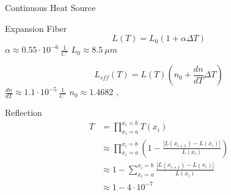 \begin{frame}{Continuous Heat Source}
	\centering
\end{frame}


\begin{frame}{Expansion Fiber}
	\centering
	\begin{equation*}
		L(T) = L_0(1 + \alpha \Delta T)
	\end{equation*}
	$\alpha \approx 0.55 \cdot 10^{-6}\ \frac{1}{C^\circ}$ \hspace*{1cm}	$L_0 \approx 8.5\ \mu m$ 
	
	\begin{equation*}
		L_{eff}(T) = L(T) \left(n_0 + \frac{dn}{dT} \Delta T\right)
	\end{equation*}
	$\frac{dn}{dT} \approx 1.1 \cdot 10^{-5}\ \frac{1}{C^\circ}$ \hspace*{1cm}	$n_0 \approx 1.4682$ , 
	
\end{frame}


\begin{frame}{Reflection}
	\begin{equation*}
		\begin{split}
			T&= \prod_{x_i=a}^{x_i=b} T(x_i)\\
			&\approx \prod_{x_i=a}^{x_i=b} \left(1-\frac{|L(x_{i+1}) - L(x_{i})|}{L(x_i)}\right)\\
			&\approx 1 - \sum_{x_i=a}^{x_i=b}\frac{|L(x_{i+1}) - L(x_{i})|}{L(x_i)}\\
			&\approx 1 - 4\cdot 10^{-7}
		\end{split}
	\end{equation*}	
\end{frame}







